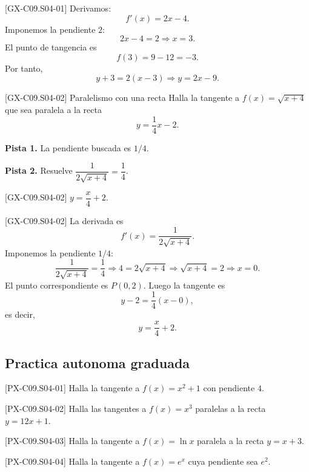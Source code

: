 \begin{fullsolution}{[GX-C09.S04-01]}
Derivamos:
\[
f'(x)=2x-4.
\]
Imponemos la pendiente \(2\):
\[
2x-4=2 \Longrightarrow x=3.
\]
El punto de tangencia es
\[
f(3)=9-12=-3.
\]
Por tanto,
\[
y+3=2(x-3)\Longrightarrow y=2x-9.
\]
\end{fullsolution}

\begin{guidedexercise}{[GX-C09.S04-02] Paralelismo con una recta}
Halla la tangente a \(f(x)=\sqrt{x+4}\) que sea paralela a la recta
\[
y=\frac{1}{4}x-2.
\]

\textbf{Pista 1.} La pendiente buscada es \(1/4\).

\textbf{Pista 2.} Resuelve \(\dfrac{1}{2\sqrt{x+4}}=\dfrac{1}{4}\).
\end{guidedexercise}

\begin{shortanswer}{[GX-C09.S04-02]}
\(y=\dfrac{x}{4}+2\).
\end{shortanswer}

\begin{fullsolution}{[GX-C09.S04-02]}
La derivada es
\[
f'(x)=\frac{1}{2\sqrt{x+4}}.
\]
Imponemos la pendiente \(1/4\):
\[
\frac{1}{2\sqrt{x+4}}=\frac{1}{4}
\Longrightarrow 4=2\sqrt{x+4}
\Longrightarrow \sqrt{x+4}=2
\Longrightarrow x=0.
\]
El punto correspondiente es \(P(0,2)\). Luego la tangente es
\[
y-2=\frac{1}{4}(x-0),
\]
es decir,
\[
y=\frac{x}{4}+2.
\]
\end{fullsolution}

\subsection*{Practica autonoma graduada}

\begin{exercise}{[PX-C09.S04-01] Halla la tangente a \(f(x)=x^2+1\) con pendiente \(4\).}
\end{exercise}

\begin{exercise}{[PX-C09.S04-02] Halla las tangentes a \(f(x)=x^3\) paralelas a la recta \(y=12x+1\).}
\end{exercise}

\begin{exercise}{[PX-C09.S04-03] Halla la tangente a \(f(x)=\ln x\) paralela a la recta \(y=x+3\).}
\end{exercise}

\begin{exercise}{[PX-C09.S04-04] Halla la tangente a \(f(x)=e^x\) cuya pendiente sea \(e^2\).}
\end{exercise}

